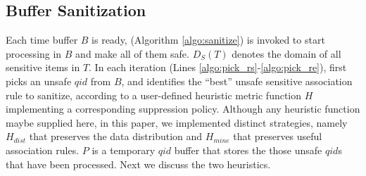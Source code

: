 \subsection{Buffer Sanitization}
\label{sec:sanitize}
Each time \qid buffer $B$ is ready, \SanitizeBuffer
(Algorithm \ref{algo:sanitize}) is invoked to start processing \qids in $B$
and make all of them safe. $D_S(T)$ denotes the domain of all sensitive
items in $T$.
In each iteration (Lines \ref{algo:pick_rs}-\ref{algo:pick_re}),
\SanitizeBuffer first picks an unsafe $qid$ from $B$,
 and identifies the ``best'' unsafe sensitive association rule
to sanitize, according to a user-defined heuristic metric function $H$
implementing a corresponding suppression policy.
Although any heuristic function maybe supplied here, in this paper,
we implemented distinct strategies, namely
$H_{dist}$ that preserves the data distribution and $H_{mine}$ that preserves
useful association rules. 
$P$ is a temporary $qid$ buffer that stores the those unsafe $qid$s that 
have been processed.
Next we discuss the two heuristics.

